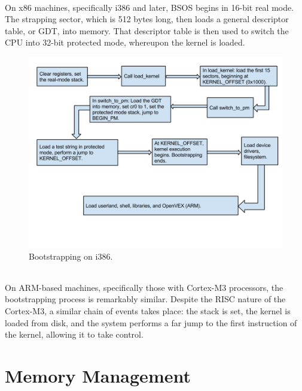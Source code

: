 \documentclass[english]{paper}
\begin{document}
\paragraph{}
On x86 machines, specifically i386 and later, BSOS begins in 16-bit real mode. The strapping sector, which is 512 bytes long, then loads a general descriptor table, or GDT, into memory. That descriptor table is then used to switch the CPU into 32-bit protected mode, whereupon the kernel is loaded.
\begin{figure}[h!]
\centerline{\includegraphics[scale=0.4]{imgs/boot_x86.png}}
\caption{Bootstrapping on i386.}
\end{figure}

\paragraph{}
On ARM-based machines, specifically those with Cortex-M3 processors, the bootstrapping process is remarkably similar. Despite the RISC nature of the Cortex-M3, a similar chain of events takes place: the stack is set, the kernel is loaded from disk, and the system performs a far jump to the first instruction of the kernel, allowing it to take control.

\part{Memory Management}
\end{document}
